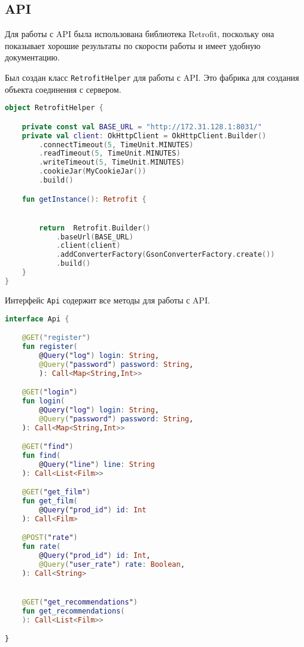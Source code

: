 
\clearpage

\subsection{API}

Для работы с API была использована библиотека Retrofit, поскольку она показывает хорошие результаты по скорости работы
и имеет удобную документацию.

Был создан класс \texttt{RetrofitHelper} для работы с API. Это фабрика для создания объекта соединения с сервером.

\begin{lstlisting}[language=Kotlin, caption=\leftline{RetrofitHelper}, label=lst:RetrofitHelper]
object RetrofitHelper {

    private const val BASE_URL = "http://172.31.128.1:8031/"
    private val client: OkHttpClient = OkHttpClient.Builder()
        .connectTimeout(5, TimeUnit.MINUTES)
        .readTimeout(5, TimeUnit.MINUTES)
        .writeTimeout(5, TimeUnit.MINUTES)
        .cookieJar(MyCookieJar())
        .build()

    fun getInstance(): Retrofit {


        return  Retrofit.Builder()
            .baseUrl(BASE_URL)
            .client(client)
            .addConverterFactory(GsonConverterFactory.create())
            .build()
    }
}
\end{lstlisting}

Интерфейс \texttt{Api} содержит все методы для работы с API.

\begin{lstlisting}[language=Kotlin, caption=\leftline{Api}, label=lst:Api]
interface Api {

    @GET("register")
    fun register(
        @Query("log") login: String,
        @Query("password") password: String,
        ): Call<Map<String,Int>>

    @GET("login")
    fun login(
        @Query("log") login: String,
        @Query("password") password: String,
    ): Call<Map<String,Int>>

    @GET("find")
    fun find(
        @Query("line") line: String
    ): Call<List<Film>>

    @GET("get_film")
    fun get_film(
        @Query("prod_id") id: Int
    ): Call<Film>

    @POST("rate")
    fun rate(
        @Query("prod_id") id: Int,
        @Query("user_rate") rate: Boolean,
    ): Call<String>


    @GET("get_recommendations")
    fun get_recommendations(
    ): Call<List<Film>>

}
\end{lstlisting}

